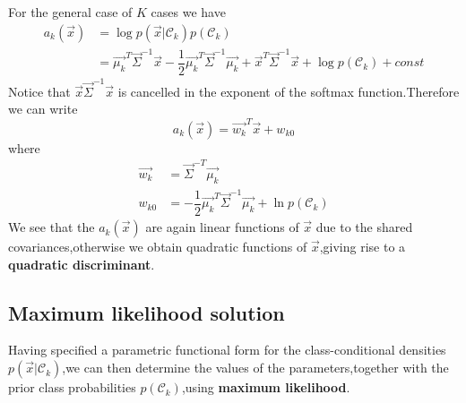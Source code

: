 For the general case of $K$ cases we have
\begin{align}
a_k(\vec{x}) &= \log p(\vec{x}|\mathcal{C}_k)p(\mathcal{C}_k)  \\
&=\vec{\mu_k}^T\vec{\Sigma}^{-1}\vec{x} - \dfrac{1}{2}{\vec{\mu_k}}^T\vec{\Sigma}^{-1}\vec{\mu_k} + \vec{x}^T\vec{\Sigma}^{-1}\vec{x}+
 \log p(\mathcal{C}_k) + const
\end{align}
Notice that $\vec{x}\vec{\Sigma}^{-1}\vec{x}$ is cancelled in the exponent of the softmax function.Therefore we can write
\begin{equation}
a_k(\vec{x}) = \vec{w_k}^T\vec{x}+w_{k0}
\end{equation}
where
\begin{align}
\vec{w_k} &= \vec{\Sigma}^{-T}\vec{\mu_k} \\
w_{k0} &= -\dfrac{1}{2}\vec{\mu_k}^T\vec{\Sigma}^{-1}\vec{\mu_k} + \ln p(\mathcal{C}_k)
\end{align}
We see that the $a_k(\vec{x})$ are again linear functions of $\vec{x}$ due to the shared covariances,otherwise we obtain quadratic functions of $\vec{x}$,giving rise to a \textbf{quadratic discriminant}.

\subsection{Maximum likelihood solution}
Having specified a parametric functional form for the class-conditional densities $p(\vec{x}|\mathcal{C}_k)$,we can then determine the values of the parameters,together with the prior class probabilities $p(\mathcal{C}_k)$,using \textbf{maximum likelihood}.

